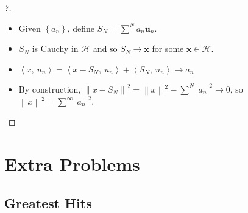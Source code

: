 \begin{proof}[?]

\envlist

\begin{itemize}
\tightlist
\item
  Given \(\left\{{a_{n}}\right\}\), define
  \(S_{N} = \sum^N a_{n} \mathbf{u}_{n}\).
\item
  \(S_{N}\) is Cauchy in \(\mathcal{H}\) and so \(S_{N} \to \mathbf{x}\)
  for some \(\mathbf{x} \in \mathcal{H}\).
\item
  \({\left\langle {x},~{u_{n}} \right\rangle} = {\left\langle {x - S_{N}},~{u_{n}} \right\rangle} + {\left\langle {S_{N}},~{u_{n}} \right\rangle} \to a_{n}\)
\item
  By construction,
  \({\left\lVert {x-S_{N}} \right\rVert}^2 = {\left\lVert {x} \right\rVert}^2 - \sum^N {\left\lvert {a_{n}} \right\rvert}^2 \to 0\),
  so
  \({\left\lVert {x} \right\rVert}^2 = \sum^\infty {\left\lvert {a_{n}} \right\rvert}^2\).
\end{itemize}

\end{proof}

\hypertarget{extra-problems}{%
\section{Extra Problems}\label{extra-problems}}

\hypertarget{greatest-hits}{%
\subsection{Greatest Hits}\label{greatest-hits}}

